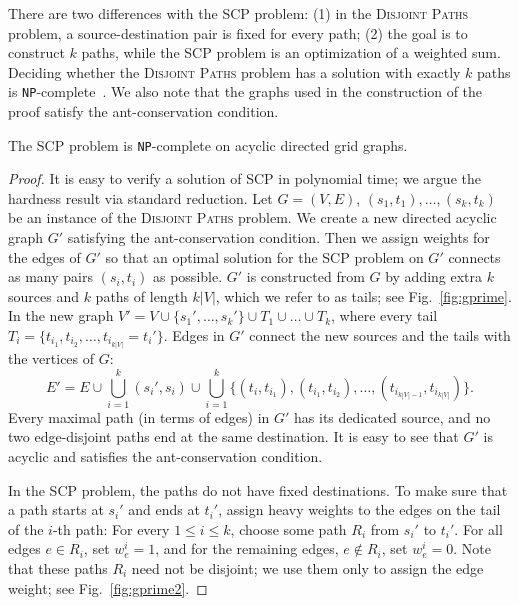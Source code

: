 \documentclass{llncs}
\newcommand{\blink}[1]{\textnormal{\texttt{#1}}}
\newcommand{\NPC}[0]{\blink{NP}-complete}
\newcommand{\SCoP}{\textsc{SCP}}
\newcommand{\EDP}{\textsc{Disjoint Paths}}
\begin{document}
There are two differences with the \SCoP{} problem: (1) in the
\EDP{} problem, a source-destination pair is fixed for every path; (2)
the goal is to construct $k$ paths, while the \SCoP{}
problem is an optimization of a weighted sum.
Deciding whether the \EDP{} problem has a solution
with exactly $k$ paths is \NPC{}~\cite{Marx04}.
We also note that the
graphs used in the construction of the proof satisfy the ant-conservation
condition.

\begin{theorem}
\label{thm:npc}
The \SCoP{} problem is \NPC{} on acyclic directed grid graphs.
\end{theorem}




\begin{proof}
It is easy to verify a solution of \SCoP{} in polynomial time;
we argue the hardness result via standard reduction.
Let $G=(V,E)$, $(s_1,t_1),
\dots, (s_k,t_k)$ be an instance of the \EDP{} problem. We create a
new directed acyclic graph $G'$ satisfying the ant-conservation
condition. Then we assign weights for the edges of $G'$ so that an
optimal solution for the \SCoP{} problem on $G'$ connects as many
pairs $(s_i,t_i)$ as possible.
$G'$ is constructed from $G$ by adding extra
$k$ sources and $k$ paths of length $k|V|$, which we refer to
as tails; see Fig.~\ref{fig:gprime}. In the new graph $V'=V \cup
\{s_1',\dots,s_k'\} \cup T_1 \cup \dots \cup T_k$, where every tail
$T_i = \{t_{i_1}, t_{i_2}, \dots, t_{i_{k|V|}}=t_i'\}$. Edges in $G'$
connect the new sources and the tails with the vertices of $G$:
$$E'=E \cup \bigcup_{i=1}^k (s_i',s_i) \cup \bigcup_{i=1}^k \{(t_i
,t_{i_1}),(t_{i_1} ,t_{i_2}), \dots,(t_{i_{k|V|-1}},t_{i_{k|V|}})\}.$$
Every maximal path (in terms of edges) in $G'$ has its dedicated source, and no two
edge-disjoint paths end at the same destination. It is easy to see
that $G'$ is acyclic and satisfies the ant-conservation condition.



In the \SCoP{} problem, the paths do not have fixed destinations. To
make sure that a path starts at $s_i'$ and ends at $t_i'$, assign
heavy weights to the edges on the tail of the $i$-th path:
For every $1\le i \le k$, choose some
path $R_i$ from $s_i'$ to $t_i'$. For all edges $e\in R_i$, set
$w^i_e = 1$, and for the remaining edges, $e\not\in R_i$, set $w^i_e
= 0$.
 Note that these paths $R_i$ need not be disjoint; we use them only to
assign the edge weight; see Fig.~\ref{fig:gprime2}.



\end{proof}
\end{document}
